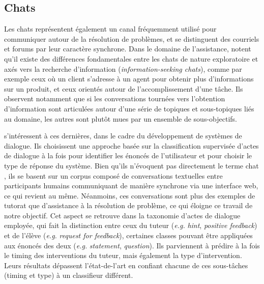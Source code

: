 \documentclass[10pt,a4paper,twoside]{article}
\begin{document}

\subsection{Chats}
\label{subsec:chats}

Les chats représentent également un canal fréquemment utilisé pour communiquer autour de la résolution de problèmes, et se distinguent des courriels et forums par leur caractère synchrone. Dans le domaine de l'assistance, \citet{stede2004information} notent qu'il existe des différences fondamentales entre les chats de nature exploratoire et axés vers la recherche d'information (\textit{information-seeking chats}), comme par exemple ceux où un client s'adresse à un agent pour obtenir plus d'informations sur un produit, et ceux orientés autour de l'accomplissement d'une tâche. Ils observent notamment que si les conversations tournées vers l'obtention d'information sont articulées autour d'une série de topiques et sous-topiques liés au domaine, les autres sont plutôt mues par un ensemble de sous-objectifs.

\citet{ha2013learning} s'intéressent à ces dernières, dans le cadre du développement de systèmes de dialogue. Ils choisissent une approche basée sur la classification supervisée d'actes de dialogue à la fois pour identifier les énoncés de l'utilisateur et pour choisir le type de réponse du système. Bien qu'ils n'évoquent pas directement le terme \og chat \fg, ils se basent sur un corpus composé de conversations textuelles entre participants humains communiquant de manière synchrone via une interface web, ce qui revient au même. Néanmoins, ces conversations sont plus des exemples de tutorat que d'assistance à la résolution de problème, ce qui éloigne ce travail de notre objectif. Cet aspect se retrouve dans la taxonomie d'actes de dialogue employée, qui fait la distinction entre ceux du tuteur (\textit{e.g.} \textit{hint}, \textit{positive feedback}) et de l'élève (\textit{e.g.} \textit{request for feedback}), certaines classes pouvant être appliquées aux énoncés des deux (\textit{e.g.} \textit{statement}, \textit{question}). Ils parviennent à prédire à la fois le timing des interventions du tuteur, mais également la type d'intervention. Leurs résultats dépassent l'état-de-l'art en confiant chacune de ces sous-tâches (timing et type) à un classifieur différent.
\end{document}
